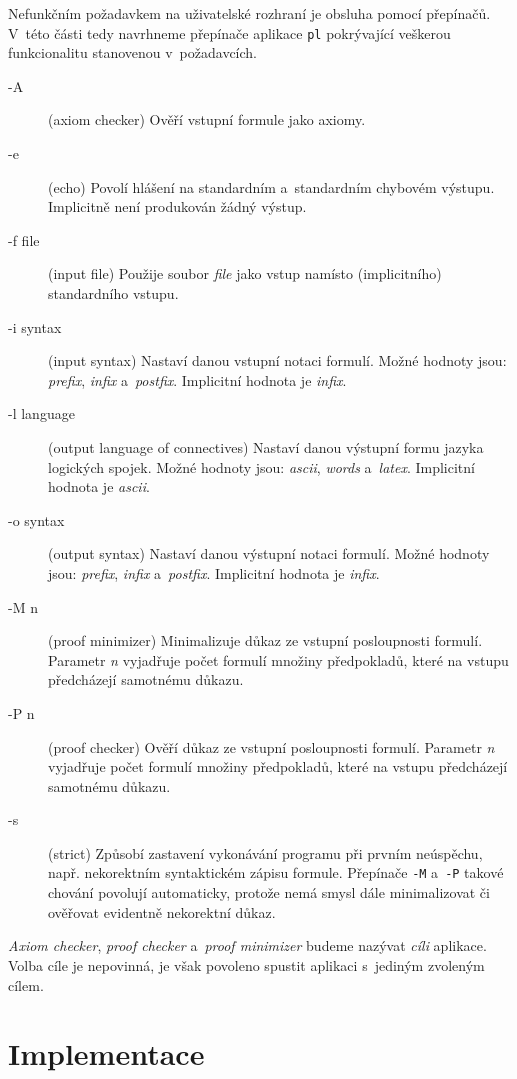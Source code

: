 \documentclass[thesis=B,czech,hidelinks]{thesis}[2012/06/26]
\begin{document}
Nefunkčním požadavkem na uživatelské rozhraní je obsluha pomocí přepínačů. V~této části tedy navrhneme přepínače aplikace \texttt{pl} pokrývající veškerou funkcionalitu stanovenou v~požadavcích. 

\begin{description}
	\item[-A] (axiom checker) Ověří vstupní formule jako axiomy.
	\item[-e] (echo) Povolí hlášení na standardním a~standardním chybovém výstupu. Implicitně není produkován žádný výstup.
	\item[-f file] (input file) Použije soubor \emph{file} jako vstup namísto (implicitního) standardního vstupu.
	\item[-i syntax] (input syntax) Nastaví danou vstupní notaci formulí. Možné hodnoty jsou: \emph{prefix}, \emph{infix} a~\emph{postfix}. Implicitní hodnota je \emph{infix}.
	\item[-l language] (output language of connectives) Nastaví danou výstupní formu jazyka logických spojek. Možné hodnoty jsou: \emph{ascii}, \emph{words} a~\emph{latex}. Implicitní hodnota je \emph{ascii}.
	\item[-o syntax] (output syntax) Nastaví danou výstupní notaci formulí. Možné hodnoty jsou: \emph{prefix}, \emph{infix} a~\emph{postfix}. Implicitní hodnota je \emph{infix}.
	\item[-M n] (proof minimizer) Minimalizuje důkaz ze vstupní posloupnosti formulí. Parametr \emph{n} vyjadřuje počet formulí množiny předpokladů, které na vstupu předcházejí samotnému důkazu.
	\item[-P n] (proof checker) Ověří důkaz ze vstupní posloupnosti formulí. Parametr \emph{n} vyjadřuje počet formulí množiny předpokladů, které na vstupu předcházejí samotnému důkazu.
	\item[-s] (strict) Způsobí zastavení vykonávání programu při prvním neúspěchu, např. nekorektním syntaktickém zápisu formule. Přepínače \texttt{-M} a~\texttt{-P} takové chování povolují automaticky, protože nemá smysl dále minimalizovat či ověřovat evidentně nekorektní důkaz.
\end{description}

\emph{Axiom checker}, \emph{proof checker} a~\emph{proof minimizer} budeme nazývat \emph{cíli} aplikace. Volba cíle je nepovinná, je však povoleno spustit aplikaci s~jediným zvoleným cílem.

%
%
%

\chapter{Implementace}
\end{document}
